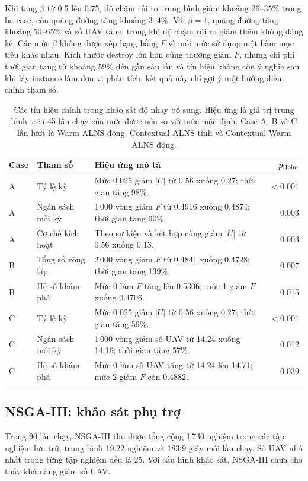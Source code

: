 \documentclass[11pt,a4paper]{article}
\begin{document}
Khi tăng $\beta$ từ 0.5 lên 0.75, độ chậm rủi ro trung bình giảm khoảng 26--35\% trong ba case, còn quãng đường tăng khoảng 3--4\%. Với $\beta=1$, quãng đường tăng khoảng 50--65\% và số UAV tăng, trong khi độ chậm rủi ro giảm thêm không đáng kể. Các mức $\beta$ không được xếp hạng bằng $F$ vì mỗi mức sử dụng một hàm mục tiêu khác nhau. Kích thước destroy lớn hơn cũng thường giảm $F$, nhưng chi phí thời gian tăng từ khoảng 59\% đến gần sáu lần và tín hiệu không còn ý nghĩa sau khi lấy instance làm đơn vị phân tích; kết quả này chỉ gợi ý một hướng điều chỉnh tham số.

\begin{table}[htbp]
\centering\small
\caption{Các tín hiệu chính trong khảo sát độ nhạy bổ sung. Hiệu ứng là giá trị trung bình trên 45 lần chạy của mức được nêu so với mức mặc định. Case A, B và C lần lượt là Warm ALNS động, Contextual ALNS tĩnh và Contextual Warm ALNS động.}
\begin{tabularx}{\linewidth}{@{}llXr@{}}
\toprule
Case & Tham số & Hiệu ứng mô tả & $p_{\rm Holm}$\\\midrule
A & Tỷ lệ kỳ & Mức 0.025 giảm $|U|$ từ 0.56 xuống 0.27; thời gian tăng 98\%. & $<0.001$\\
A & Ngân sách mỗi kỳ & 1\,000 vòng giảm $F$ từ 0.4916 xuống 0.4874; thời gian tăng 90\%. & 0.003\\
A & Cơ chế kích hoạt & Theo sự kiện và kết hợp cùng giảm $|U|$ từ 0.56 xuống 0.13. & 0.003\\
B & Tổng số vòng lặp & 2\,000 vòng giảm $F$ từ 0.4841 xuống 0.4728; thời gian tăng 139\%. & 0.007\\
B & Hệ số khám phá & Mức 0 làm $F$ tăng lên 0.5306; mức 1 giảm $F$ xuống 0.4706. & 0.015\\
C & Tỷ lệ kỳ & Mức 0.025 giảm $|U|$ từ 0.56 xuống 0.27; thời gian tăng 59\%. & $<0.001$\\
C & Ngân sách mỗi kỳ & 1\,000 vòng giảm số UAV từ 14.24 xuống 14.16; thời gian tăng 57\%. & 0.012\\
C & Hệ số khám phá & Mức 0 làm số UAV tăng từ 14.24 lên 14.71; mức 2 giảm $F$ còn 0.4882. & 0.039\\
\bottomrule
\end{tabularx}
\label{tab:sensitivity-screening}
\end{table}

\subsection{NSGA-III: khảo sát phụ trợ}
Trong 90 lần chạy, NSGA-III thu được tổng cộng 1\,730 nghiệm trong các tập nghiệm lưu trữ, trung bình 19.22 nghiệm và 183.9 giây mỗi lần chạy. Số UAV nhỏ nhất trong từng tập nghiệm đều là 25. Với cấu hình khảo sát, NSGA-III chưa cho thấy khả năng giảm số UAV.
\end{document}
